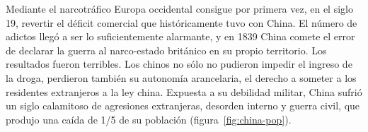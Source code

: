 \documentclass[a4paper,10pt]{book}
\theoremstyle{definition}
\begin{document}

Mediante el narcotráfico Europa occidental consigue por primera vez, en el siglo 19, revertir el déficit comercial que históricamente tuvo con China.
El número de adictos llegó a ser lo suficientemente alarmante, y en 1839 China comete el error de declarar la guerra al narco-estado británico en su propio territorio.
Los resultados fueron terribles.
Los chinos no sólo no pudieron impedir el ingreso de la droga, perdieron también su autonomía arancelaria, el derecho a someter a los residentes extranjeros a la ley china.
Expuesta a su debilidad militar, China sufrió un siglo calamitoso de agresiones extranjeras, desorden interno y guerra civil, que produjo una caída de 1/5 de su población (figura~\ref{fig:china-pop}).

\end{document}
